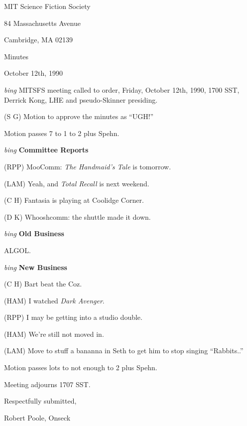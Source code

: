 \setlength{\topmargin}{-0.5in}
\setlength{\oddsidemargin}{0.0in}
\setlength{\evensidemargin}{0.0in}
\setlength{\textheight}{9in}
\setlength{\textwidth}{6.5in}



\begin{center}
MIT Science Fiction Society

84 Massachusetts Avenue

Cambridge, MA 02139

\vspace{0.2in}
Minutes

October 12th, 1990

\end{center}
 
\vspace{0.15in}
{\em bing\/}  MITSFS meeting called to order, Friday, October 12th, 1990,
1700 SST, Derrick Kong, LHE and pseudo-Skinner presiding.

(S G) Motion to approve the minutes as ``UGH!''

Motion passes 7 to 1 to 2 plus Spehn.

\vspace{0.15in}
{\em bing\/} {\bf Committee Reports\/}

(RPP) MooComm: {\em The Handmaid's Tale\/} is tomorrow.

(LAM) Yeah, and {\em Total Recall} is next weekend.

(C H) Fantasia is playing at Coolidge Corner.

(D K) Whooshcomm: the shuttle made it down.

\vspace{.15in}
{\em bing\/} {\bf Old Business\/}

ALGOL.

\vspace{0.15in}
{\em bing\/} {\bf New Business\/}

(C H) Bart beat the Coz.

(HAM) I watched {\em Dark Avenger\/}.

(RPP) I may be getting into a studio double.

(HAM) We're still not moved in.

(LAM) Move to stuff a bananna in Seth to get him to stop singing ``Rabbits..''

Motion passes lots to not enough to 2 plus Spehn.

Meeting adjourns 1707 SST.

\vspace{0.15in}
\begin{center}
Respectfully submitted,

Robert Poole, Onseck
\end{center}

